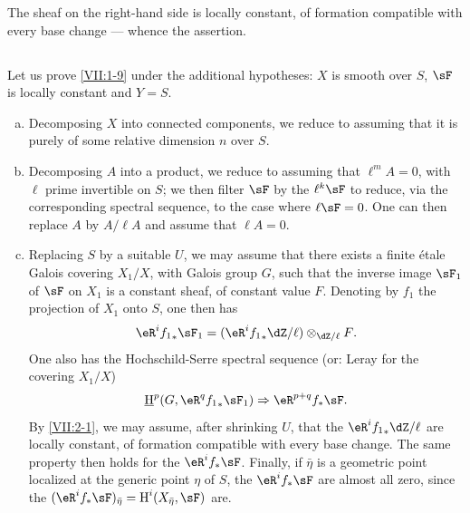The sheaf on the right-hand side is locally constant, of formation compatible
with every base change --- whence the assertion.




\subsection{}\label{VII:2-2}

Let us prove \ref{VII:1-9} under the additional hypotheses: $X$ is smooth over
$S$, $\sF$ is locally constant and $Y=S$.
\begin{enumerate}[a)]
  \item Decomposing $X$ into connected components, we reduce to assuming
    that it is purely of some relative dimension $n$ over $S$.
  \item Decomposing $A$ into a product, we reduce to assuming that
    $\ell^m A=0$, with $\ell$ prime invertible on $S$; we then filter $\sF$
    by the $\ell^k \sF$ to reduce, via the corresponding spectral
    sequence, to the case where $\ell\sF=0$. One can then replace $A$ by
    $A/\ell A$ and assume that $\ell A=0$.
  \item Replacing $S$ by a suitable $U$, we may assume that there exists a
    finite \'etale Galois covering $X_1/X$, with Galois group $G$, such
    that the inverse image $\sF_1$ of $\sF$ on $X_1$ is a constant sheaf,
    of constant value $F$. Denoting by $f_1$ the projection of $X_1$ onto
    $S$, one then has
    \[
      \eR^i {f_1}_\ast \sF_1 = (\eR^i {f_1}_\ast \dZ/\ell)\otimes_{\dZ/\ell} F \text{.}
    \]
    One also has the Hochschild-Serre spectral sequence (or: Leray
    for the covering $X_1/X$)
    \[
      \underline\h^p(G,\eR^q {f_1}_\ast \sF_1) \Rightarrow \eR^{p+q} f_\ast \sF \text{.}
    \]
    By \ref{VII:2-1}, we may assume, after shrinking $U$, that
    the $\eR^i {f_1}_\ast \dZ/\ell$ are locally constant, of formation
    compatible with every base change. The same property then holds
    for the $\eR^i f_\ast \sF$. Finally, if $\bar\eta$ is a
    geometric point localized at the generic point $\eta$ of $S$, the
    $\eR^i f_\ast\sF$ are almost all zero, since the
    $(\eR^i f_\ast \sF)_{\bar\eta} = \h^i(X_{\bar \eta},\sF)$ are.
\end{enumerate}




\subsection{}\label{VII:2-3}


